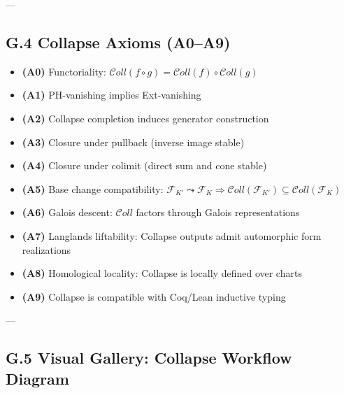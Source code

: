 \documentclass[11pt]{article}
\begin{document}
---

\subsection*{G.4 Collapse Axioms (A0–A9)}

\begin{itemize}
    \item \textbf{(A0)} Functoriality: \( \mathcal{C}oll(f \circ g) = \mathcal{C}oll(f) \circ \mathcal{C}oll(g) \)
    \item \textbf{(A1)} PH-vanishing implies Ext-vanishing
    \item \textbf{(A2)} Collapse completion induces generator construction
    \item \textbf{(A3)} Closure under pullback (inverse image stable)
    \item \textbf{(A4)} Closure under colimit (direct sum and cone stable)
    \item \textbf{(A5)} Base change compatibility: \( \mathcal{F}_{K'} \leadsto \mathcal{F}_K \Rightarrow \mathcal{C}oll(\mathcal{F}_{K'}) \subseteq \mathcal{C}oll(\mathcal{F}_K) \)
    \item \textbf{(A6)} Galois descent: \( \mathcal{C}oll \) factors through Galois representations
    \item \textbf{(A7)} Langlands liftability: Collapse outputs admit automorphic form realizations
    \item \textbf{(A8)} Homological locality: Collapse is locally defined over charts
    \item \textbf{(A9)} Collapse is compatible with Coq/Lean inductive typing
\end{itemize}

---

\subsection*{G.5 Visual Gallery: Collapse Workflow Diagram}

\begin{center}
\end{center}
\end{document}
